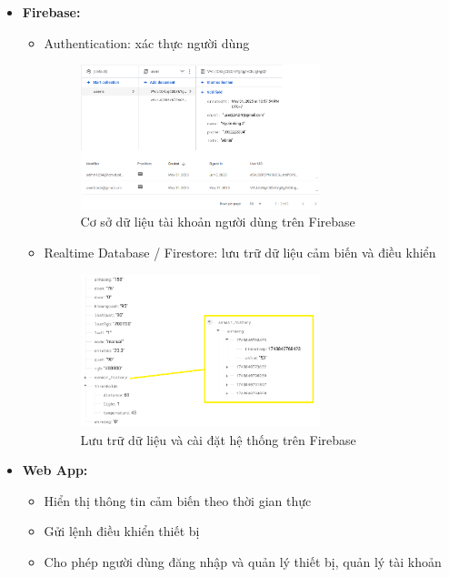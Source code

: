 \begin{itemize}
    \item \textbf{Firebase:}
          \begin{itemize}
              \item Authentication: xác thực người dùng
                    \begin{figure}[H]
                        \centering
                        \includegraphics[width=0.7\textwidth]{figures/firebase2.png}
                        \caption{Cơ sở dữ liệu tài khoản người dùng trên Firebase}
                        \label{fig:firebase2}
                    \end{figure}
              \item Realtime Database / Firestore: lưu trữ dữ liệu cảm biến và điều khiển
                    \begin{figure}[H]
                        \centering
                        \includegraphics[width=0.7\textwidth]{figures/firebase1.png}
                        \caption{Lưu trữ dữ liệu và cài đặt hệ thống trên Firebase}
                        \label{fig:firebase1}
                    \end{figure}
          \end{itemize}



    \item \textbf{Web App:}
          \begin{itemize}
              \item Hiển thị thông tin cảm biến theo thời gian thực
              \item Gửi lệnh điều khiển thiết bị
              \item Cho phép người dùng đăng nhập và quản lý thiết bị, quản lý tài khoản
          \end{itemize}
\end{itemize}


